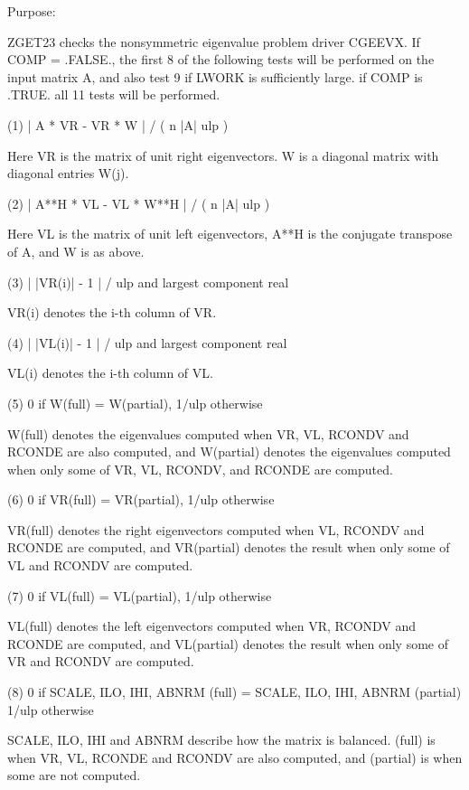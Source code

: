 \begin{DoxyParagraph}{Purpose\+: }
\begin{DoxyVerb}    ZGET23  checks the nonsymmetric eigenvalue problem driver CGEEVX.
    If COMP = .FALSE., the first 8 of the following tests will be
    performed on the input matrix A, and also test 9 if LWORK is
    sufficiently large.
    if COMP is .TRUE. all 11 tests will be performed.

    (1)     | A * VR - VR * W | / ( n |A| ulp )

      Here VR is the matrix of unit right eigenvectors.
      W is a diagonal matrix with diagonal entries W(j).

    (2)     | A**H * VL - VL * W**H | / ( n |A| ulp )

      Here VL is the matrix of unit left eigenvectors, A**H is the
      conjugate transpose of A, and W is as above.

    (3)     | |VR(i)| - 1 | / ulp and largest component real

      VR(i) denotes the i-th column of VR.

    (4)     | |VL(i)| - 1 | / ulp and largest component real

      VL(i) denotes the i-th column of VL.

    (5)     0 if W(full) = W(partial), 1/ulp otherwise

      W(full) denotes the eigenvalues computed when VR, VL, RCONDV
      and RCONDE are also computed, and W(partial) denotes the
      eigenvalues computed when only some of VR, VL, RCONDV, and
      RCONDE are computed.

    (6)     0 if VR(full) = VR(partial), 1/ulp otherwise

      VR(full) denotes the right eigenvectors computed when VL, RCONDV
      and RCONDE are computed, and VR(partial) denotes the result
      when only some of VL and RCONDV are computed.

    (7)     0 if VL(full) = VL(partial), 1/ulp otherwise

      VL(full) denotes the left eigenvectors computed when VR, RCONDV
      and RCONDE are computed, and VL(partial) denotes the result
      when only some of VR and RCONDV are computed.

    (8)     0 if SCALE, ILO, IHI, ABNRM (full) =
                 SCALE, ILO, IHI, ABNRM (partial)
            1/ulp otherwise

      SCALE, ILO, IHI and ABNRM describe how the matrix is balanced.
      (full) is when VR, VL, RCONDE and RCONDV are also computed, and
      (partial) is when some are not computed.


\end{DoxyVerb}
\end{DoxyParagraph}
